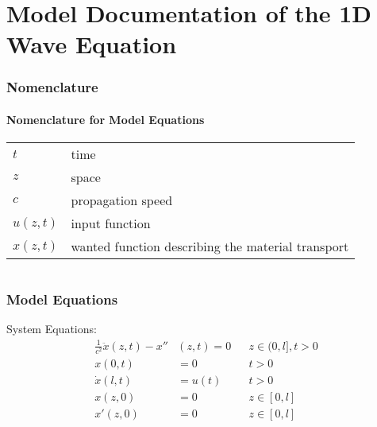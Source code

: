 \documentclass[10pt,a4paper]{article}
\begin{document}
	\part*{Model Documentation of the 1D Wave Equation} %
	
	
	\section{Nomenclature} %
	\subsection{Nomenclature for Model Equations} %
	
	\begin{tabular}{ll}
		$t$ & time \\
		$z$ & space \\
		$c$ & propagation speed \\
		$u(z, t)$ & input function \\
		$x(z, t)$ & wanted function describing the material transport
				
	\end{tabular}
	 
	
	\begin{tabular}{ll}

	\end{tabular}
	
	
	\section{Model Equations} %
	
	\noindent System Equations:			
	\begin{subequations}
	\begin{align*}
		\frac{1}{c^2}\ddot{x}(z,t) -  x''&(z,t) = 0 && z\in (0, l], t>0\\
		x(0,t) &= 0 && t>0\\
		\dot{x}(l, t) &= u(t) && t>0\\
		x(z,0) &=0 && z\in  [0, l]\\
		x'(z,0) &=0 && z\in  [0, l]
	\end{align*}
	\end{subequations}
\end{document}
